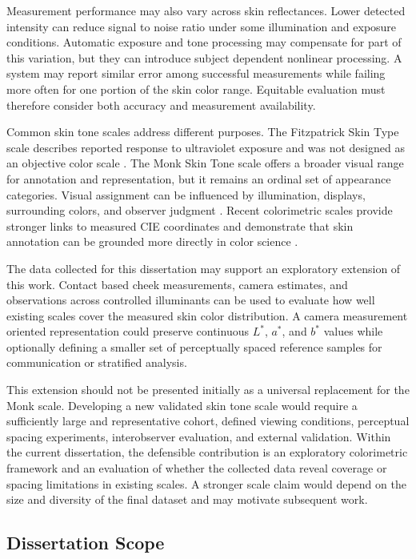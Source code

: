 \documentclass[12pt]{article}
\begin{document}
Measurement performance may also vary across skin reflectances. Lower detected intensity can reduce signal to noise ratio under some illumination and exposure conditions. Automatic exposure and tone processing may compensate for part of this variation, but they can introduce subject dependent nonlinear processing. A system may report similar error among successful measurements while failing more often for one portion of the skin color range. Equitable evaluation must therefore consider both accuracy and measurement availability.

Common skin tone scales address different purposes. The Fitzpatrick Skin Type scale describes reported response to ultraviolet exposure and was not designed as an objective color scale \cite{gupta2019}. The Monk Skin Tone scale offers a broader visual range for annotation and representation, but it remains an ordinal set of appearance categories. Visual assignment can be influenced by illumination, displays, surrounding colors, and observer judgment \cite{heldreth2024}. Recent colorimetric scales provide stronger links to measured CIE coordinates and demonstrate that skin annotation can be grounded more directly in color science \cite{cook2025}.

The data collected for this dissertation may support an exploratory extension of this work. Contact based cheek measurements, camera estimates, and observations across controlled illuminants can be used to evaluate how well existing scales cover the measured skin color distribution. A camera measurement oriented representation could preserve continuous \(L^*\), \(a^*\), and \(b^*\) values while optionally defining a smaller set of perceptually spaced reference samples for communication or stratified analysis.

This extension should not be presented initially as a universal replacement for the Monk scale. Developing a new validated skin tone scale would require a sufficiently large and representative cohort, defined viewing conditions, perceptual spacing experiments, interobserver evaluation, and external validation. Within the current dissertation, the defensible contribution is an exploratory colorimetric framework and an evaluation of whether the collected data reveal coverage or spacing limitations in existing scales. A stronger scale claim would depend on the size and diversity of the final dataset and may motivate subsequent work.

\subsection{Dissertation Scope}
\end{document}
